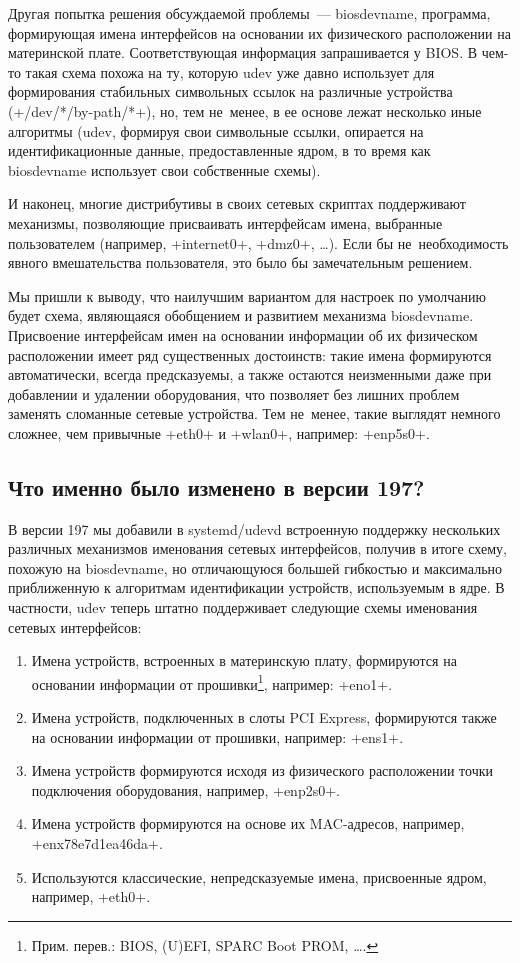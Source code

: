 \documentclass[10pt,oneside,a4paper]{article}
\begin{document}
Другая попытка решения обсуждаемой проблемы~--- biosdevname, программа,
формирующая имена интерфейсов на основании их физического расположении на
материнской плате. Соответствующая информация запрашивается у BIOS. В чем-то
такая схема похожа на ту, которую udev уже давно использует для формирования
стабильных символьных ссылок на различные устройства (+/dev/*/by-path/*+), но,
тем не~менее, в ее основе лежат несколько иные алгоритмы (udev, формируя свои
символьные ссылки, опирается на идентификационные данные, предоставленные
ядром, в то время как biosdevname использует свои собственные схемы).

И наконец, многие дистрибутивы в своих сетевых скриптах поддерживают механизмы,
позволяющие присваивать интерфейсам имена, выбранные пользователем (например,
+internet0+, +dmz0+, \ldots). Если бы не~необходимость явного вмешательства
пользователя, это было бы замечательным решением.

Мы пришли к выводу, что наилучшим вариантом для настроек по умолчанию будет
схема, являющаяся обобщением и развитием механизма biosdevname. Присвоение
интерфейсам имен на основании информации об их физическом расположении имеет ряд
существенных достоинств: такие имена формируются автоматически, всегда
предсказуемы, а также остаются неизменными даже при добавлении и удалении
оборудования, что позволяет без лишних проблем заменять сломанные сетевые
устройства. Тем не~менее, такие выглядят немного сложнее, чем привычные +eth0+ и
+wlan0+, например: +enp5s0+.

\subsection{Что именно было изменено в версии 197?}

В версии 197 мы добавили в systemd/udevd встроенную поддержку нескольких
различных механизмов именования сетевых интерфейсов, получив в итоге схему,
похожую на biosdevname, но отличающуюся большей гибкостью и максимально
приближенную к алгоритмам идентификации устройств, используемым в ядре.
В частности, udev теперь штатно поддерживает следующие схемы именования
сетевых интерфейсов:
\begin{enumerate}
	\item Имена устройств, встроенных в материнскую плату, формируются на
		основании информации от прошивки\footnote{Прим. перев.:
		BIOS, (U)EFI, SPARC Boot PROM, \ldots.}, например: +eno1+.
	\item Имена устройств, подключенных в слоты PCI Express, формируются
		также на основании информации от прошивки, например: +ens1+.
	\item Имена устройств формируются исходя из физического расположении
		точки подключения оборудования, например, +enp2s0+.
	\item Имена устройств формируются на основе их MAC-адресов, например,
		+enx78e7d1ea46da+.
	\item Используются классические, непредсказуемые имена, присвоенные
		ядром, например, +eth0+.
\end{enumerate}
\end{document}
